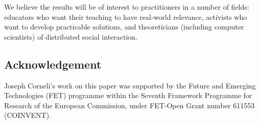 We believe the results will be of interest to practitioners in a number of fields: educators who want their teaching to have real-world relevance, activists who want to develop practicable solutions, and theoreticians (including computer scientists) of distributed social interaction.

\subsection{Acknowledgement}
Joseph Corneli's work on this paper was supported by the Future and Emerging
Technologies (FET) programme within the Seventh Framework Programme
for Research of the European Commission, under FET-Open Grant number
611553 (COINVENT).

